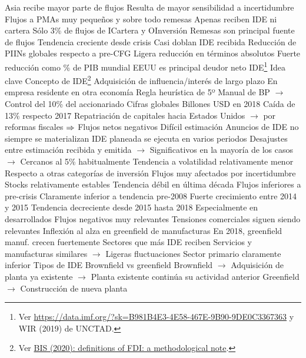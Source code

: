 \documentclass{nuevotema}
\begin{document}
\begin{esquemal}
				\4 Asia recibe mayor parte de flujos
				\4 Resulta de mayor sensibilidad a incertidumbre
			\3[vi] Flujos a PMAs muy pequeños y sobre todo remesas
				\4 Apenas reciben IDE ni cartera
				\4 Sólo 3\% de flujos de ICartera y OInversión
				\4 Remesas son principal fuente de flujos
				\4[] Tendencia creciente desde crisis
				\4[] Casi doblan IDE recibida
			\3[vii] Reducción de PIINs globales respecto  a pre-CFG
				\4 Ligera reducción en términos absolutos
				\4 Fuerte reducción como \% de PIB mundial
				\4 EEUU es principal deudor neto
		\2 IDE\footnote{Ver \url{https://data.imf.org/?sk=B981B4E3-4E58-467E-9B90-9DE0C3367363} y WIR (2019) de UNCTAD.}
			\3 Idea clave
				\4 Concepto de IDE\footnote{Ver \href{https://www.bis.org/publ/cgfs22bde3.pdf}{BIS (2020): definitions of FDI: a methodological note}.}
				\4[] Adquisición de influencia/interés de largo plazo
				\4[] En empresa residente en otra economía
				\4[] Regla heurística de 5º Manual de BP
				\4[] $\to$ Control del 10\% del accionariado
				\4 Cifras globales
				 Billones USD en 2018
				\4[] Caída de 13\% respecto 2017
				\4[] Repatriación de capitales hacia Estados Unidos
				\4[] $\to$ por reformas fiscales
				\4[] $\Rightarrow$ Flujos netos negativos
				\4 Difícil estimación
				\4[] Anuncios de IDE no siempre se materializan
				\4[] IDE planeada se ejecuta en varios periodos
				\4[] Desajustes entre estimación recibida y emitida
				\4[] $\to$ Significativos en la mayoría de los casos
				\4[] $\to$ Cercanos al 5\% habitualmente
				\4 Tendencia a volatilidad relativamente menor
				\4[] Respecto a otras categorías de inversión
				\4 Flujos muy afectados por incertidumbre
				\4 Stocks relativamente estables
				\4 Tendencia débil en última década
				\4[] Flujos inferiores a pre-crisis
				\4[] Claramente inferior a tendencia pre-2008
				\4 Fuerte crecimiento entre 2014 y 2015
				\4 Tendencia decreciente desde 2015 hasta 2018
				\4[] Especialmente en desarrollados
				\4[] Flujos negativos muy relevantes
				\4 Tensiones comerciales siguen siendo relevantes
				\4 Inflexión al alza en greenfield de manufacturas
				\4[] En 2018, greenfield manuf. crecen fuertemente
				\4 Sectores que más IDE reciben
				\4[] Servicios y manufacturas similares
				\4[] $\to$ Ligeras fluctuaciones
				\4[] Sector primario claramente inferior
			\3 Tipos de IDE
				\4 Brownfield vs greenfield
				\4[] Brownfield
				\4[] $\to$ Adquisición de planta ya existente
				\4[] $\to$ Planta existente continúa su actividad anterior
				\4[] Greenfield
				\4[] $\to$ Construcción de nueva planta

\end{esquemal}
\end{document}
